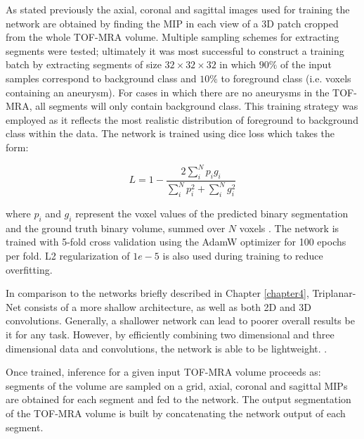 As stated previously the axial, coronal and sagittal images used for training the network are obtained by finding the MIP in each view of a 3D patch cropped from the whole TOF-MRA volume. Multiple sampling schemes for extracting segments were tested; ultimately it was most successful to construct a training batch by extracting segments of size $32 \times 32 \times 32$ in which $90\%$ of the input samples correspond to background class and $10\%$ to foreground class (i.e. voxels containing an aneurysm). For cases in which there are no aneurysms in the TOF-MRA, all segments will only contain background class. This training strategy was employed as it reflects the most realistic distribution of foreground to background class within the data. The network is trained using dice loss which takes the form: 

\[L = 1 - \frac{2\sum_{i}^{N}p_{i}g_{i}}{\sum_{i}^{N}p_{i}^{2} + \sum_{i}^{N}g_{i}^{2}} \]

where $p_{i}$ and $g_{i}$ represent the voxel values of the predicted binary segmentation and the ground truth binary volume, summed over $N$ voxels \cite{milletari2016v}. The network is trained with 5-fold cross validation using the AdamW optimizer for 100 epochs per fold. L2 regularization of $1e-5$ is also used during training to reduce overfitting.

In comparison to the networks briefly described in Chapter \ref{chapter4}, Triplanar-Net consists of a more shallow architecture, as well as both 2D and 3D convolutions. Generally, a shallower network can lead to poorer overall results be it for any task. However, by efficiently combining two dimensional and three dimensional data and convolutions, the network is able to be lightweight. . 

Once trained, inference for a given input TOF-MRA volume proceeds as: segments of the volume are sampled on a grid, axial, coronal and sagittal MIPs are obtained for each segment and fed to the network. The output segmentation of the TOF-MRA volume is built by concatenating the network output of each segment.

